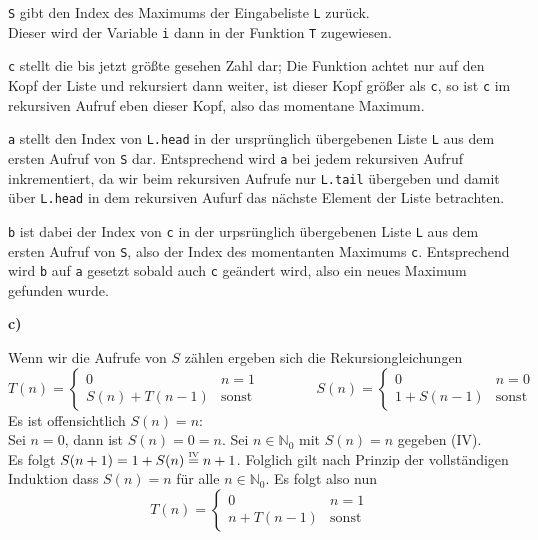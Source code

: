 \documentclass[a4paper,graphics,11pt]{article}
\newcommand{\up}[2]{\mathrel{\overset{\makebox[0pt]{\mbox{\normalfont\tiny #2}}}{#1}}}
\begin{document}
\texttt{S} gibt den Index des Maximums der Eingabeliste \texttt{L} zurück.\\
Dieser wird der Variable \texttt{i} dann in der Funktion \texttt{T} zugewiesen.

\texttt{c} stellt die bis jetzt größte gesehen Zahl dar; Die Funktion achtet nur auf den
Kopf der Liste und rekursiert dann weiter, ist dieser Kopf größer als \texttt{c}, so ist
\texttt{c} im rekursiven Aufruf eben dieser Kopf, also das momentane Maximum.

\texttt{a} stellt den Index von \texttt{L.head} in der ursprünglich übergebenen Liste \texttt{L} aus dem
ersten Aufruf von \texttt{S} dar. Entsprechend wird \texttt{a} bei jedem rekursiven Aufruf inkrementiert,
da wir beim rekursiven Aufrufe nur \texttt{L.tail} übergeben und damit über \texttt{L.head} in dem
rekursiven Aufurf das nächste Element der Liste betrachten.

\texttt{b} ist dabei der Index von \texttt{c} in der urpsrünglich übergebenen Liste \texttt{L} aus dem
ersten Aufruf von \texttt{S}, also der Index des momentanten Maximums \texttt{c}.
Entsprechend wird \texttt{b} auf \texttt{a} gesetzt sobald auch
\texttt{c} geändert wird, also ein neues Maximum gefunden wurde.

\textbf{c)}

Wenn wir die Aufrufe von $S$ zählen ergeben sich die Rekursiongleichungen
$$
    T(n) = \begin{cases}
        0 & n = 1\\
        S(n) + T(n-1)& \text{sonst}
    \end{cases}
    \qquad\qquad
    S(n) = \begin{cases}
        0 & n = 0\\
        1 + S(n-1)& \text{sonst}
    \end{cases}
$$
Es ist offensichtlich $S(n) = n$:\\
Sei $n = 0$, dann ist $S(n) = 0 = n$. Sei $n \in \mathbb{N}_0$ mit $S(n) = n$ gegeben (IV).\\
Es folgt $S(n+1) = 1 + S(n) \up{=}{IV} n+1$. Folglich gilt nach Prinzip der vollständigen Induktion
dass $S(n) = n$ für alle $n \in \mathbb{N}_0$.
Es folgt also nun
$$
    T(n) = \begin{cases}
        0 & n = 1\\
        n + T(n-1)& \text{sonst}
    \end{cases}
$$
\end{document}
